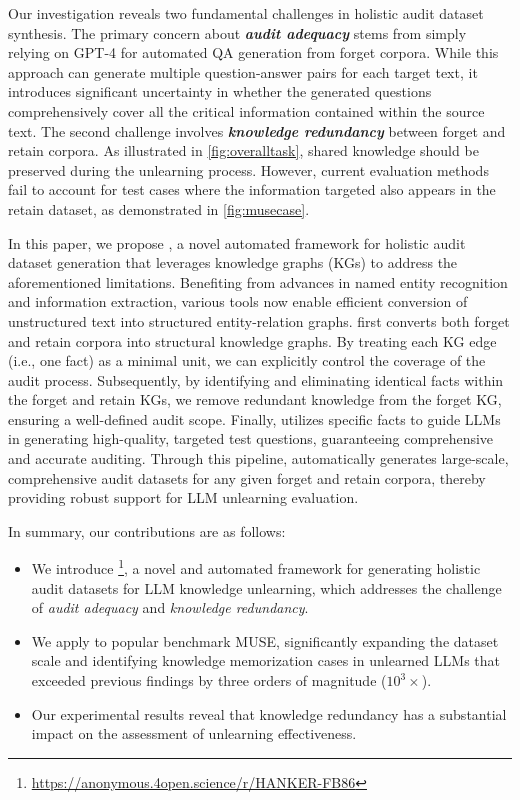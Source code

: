 Our investigation reveals two fundamental challenges in holistic audit dataset synthesis. The primary concern about \textit{\textbf{audit adequacy}} stems from  simply relying on GPT-4 for automated QA generation from forget corpora. While this approach can generate multiple question-answer pairs for each target text, it introduces significant uncertainty in whether the generated questions comprehensively cover all the critical information contained within the source text.
The second challenge involves \textbf{\textit{knowledge redundancy}} between forget and retain corpora. As illustrated in \autoref{fig:overalltask}, shared knowledge should be preserved during the unlearning process. However, current evaluation methods fail to account for test cases where the information targeted also appears in the retain dataset, as demonstrated in \autoref{fig:musecase}.



In this paper, we propose \sys, a novel automated framework for holistic audit dataset generation that leverages knowledge graphs (KGs) to address the aforementioned limitations.
Benefiting from advances in named entity recognition and information extraction, various tools now enable efficient conversion of unstructured text into structured entity-relation graphs. 
\sys first converts both forget and retain corpora into structural knowledge graphs. By treating each KG edge (i.e., one fact) as a minimal unit, we can explicitly control the coverage of the audit process. 
Subsequently, by identifying and eliminating identical facts within the forget and retain KGs, we remove redundant knowledge from the forget KG, ensuring a well-defined audit scope. 
Finally, \sys utilizes specific facts to guide LLMs in generating high-quality, targeted test questions, guaranteeing comprehensive and accurate auditing.
Through this pipeline, \sys automatically generates large-scale, comprehensive audit datasets for any given forget and retain corpora, thereby providing robust support for LLM unlearning evaluation.

In summary, our contributions are as follows:
\begin{itemize}
    \item We introduce \sys\footnote{\url{https://anonymous.4open.science/r/HANKER-FB86}}, a novel and automated framework for generating holistic audit datasets for LLM knowledge unlearning, which addresses the challenge of \textit{audit adequacy} and \textit{knowledge redundancy}.
    \item We apply \sys to popular benchmark MUSE, significantly expanding the dataset scale and identifying knowledge memorization cases in unlearned LLMs that exceeded previous findings by three orders of magnitude ($10^3\times$).
    \item Our experimental results reveal that knowledge redundancy has a substantial impact on the assessment of unlearning effectiveness.
\end{itemize}

